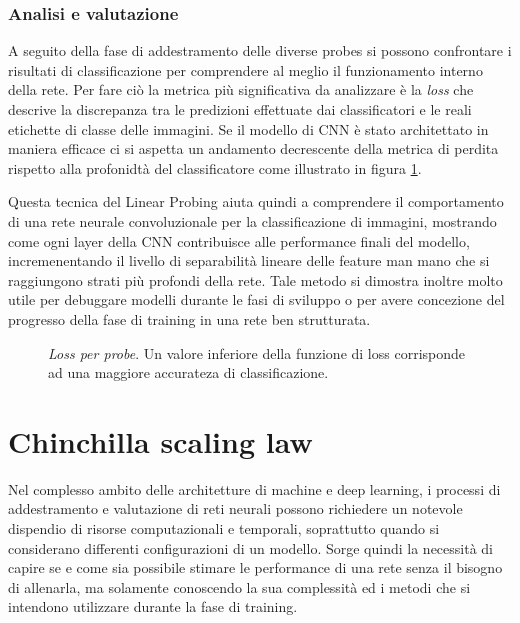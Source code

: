\subsubsection{Analisi e valutazione}

A seguito della fase di addestramento delle diverse probes si possono confrontare i risultati di classificazione per comprendere al meglio il funzionamento interno della rete. Per fare ciò la metrica più significativa da analizzare è la \textit{loss} che descrive la discrepanza tra le predizioni effettuate dai classificatori e le reali etichette di classe delle immagini. Se il modello di CNN è stato architettato in maniera efficace ci si aspetta un andamento decrescente della metrica di perdita rispetto alla profonidtà del classificatore come illustrato in figura \ref{fig:probe}.

Questa tecnica del Linear Probing aiuta quindi a comprendere il comportamento di una rete neurale convoluzionale per la classificazione di immagini, mostrando come ogni layer della CNN contribuisce alle performance finali del modello, incremenentando il livello di separabilità lineare delle feature man mano che si raggiungono strati più profondi della rete. Tale metodo si dimostra inoltre molto utile per debuggare modelli durante le fasi di sviluppo o per avere concezione del progresso della fase di training in una rete ben strutturata. 

\begin{figure}[ht!]
    \centering
    \caption{\textit{Loss per probe}. Un valore inferiore della funzione di loss corrisponde ad una maggiore accurateza di classificazione.}
    \label{fig:probe}
\end{figure}

\section{Chinchilla scaling law}
\label{sec:chinchilla}

Nel complesso ambito delle architetture di machine e deep learning, i processi di addestramento e valutazione di reti neurali possono richiedere un notevole dispendio di risorse computazionali e temporali, soprattutto quando si considerano differenti configurazioni di un modello. Sorge quindi la necessità di capire se e come sia possibile 
stimare le performance di una rete senza il bisogno di allenarla, ma solamente conoscendo la sua complessità ed i metodi che si intendono utilizzare durante la fase di training. 

